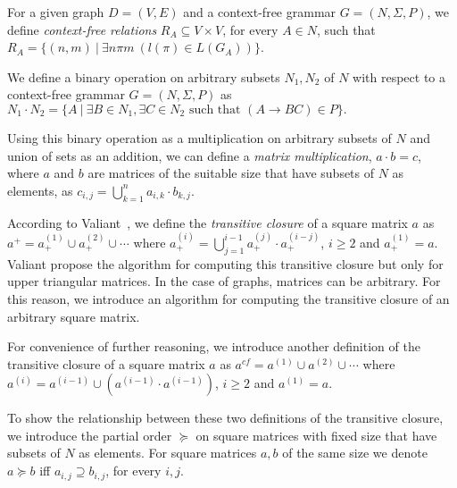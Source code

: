 For a given graph $D = (V, E)$ and a context-free grammar $G = (N, \Sigma, P)$, we define \textit{context-free relations} $R_A \subseteq V \times V$, for every $A \in N$, such that $R_A = \{(n,m)~|~\exists n \pi m~(l(\pi) \in L(G_A))\}$.

We define a binary operation on arbitrary subsets $N_1 , N_2$ of $N$ with respect to a context-free grammar $G = (N, \Sigma, P)$ as $N_1 \cdot N_2 = \{A~|~\exists B \in N_1, \exists C \in N_2 \text{ such that }(A \rightarrow B C) \in P\}.$

Using this binary operation as a multiplication on arbitrary subsets of $N$ and union of sets as an addition, we can define a \textit{matrix multiplication}, $a \cdot b = c$, where $a$ and $b$ are matrices of the suitable size that have subsets of $N$ as elements, as $c_{i,j} = \bigcup^{n}_{k=1}{a_{i,k} \cdot b_{k,j}}$.

According to Valiant~\cite{valiant}, we define the \textit{transitive closure} of a square matrix $a$ as $a^+ = a^{(1)}_+ \cup a^{(2)}_+ \cup \cdots$ where $a^{(i)}_+ = \bigcup^{i-1}_{j=1}{a^{(j)}_+ \cdot a^{(i-j)}_+}$, $i \ge 2$ and $a^{(1)}_+ = a$. Valiant propose the algorithm for computing this transitive closure but only for upper triangular matrices. In the case of graphs, matrices can be arbitrary. For this reason, we introduce an algorithm for computing the transitive closure of an arbitrary square matrix.

For convenience of further reasoning, we introduce another definition of the transitive closure of a square matrix $a$ as $a^{cf} = a^{(1)} \cup a^{(2)} \cup \cdots$ where $a^{(i)} = a^{(i-1)} \cup (a^{(i-1)} \cdot a^{(i-1)})$, $i \ge 2$ and $a^{(1)} = a$.

To show the relationship between these two definitions of the transitive closure, we introduce the partial order $\succeq$ on square matrices with fixed size that have subsets of $N$ as elements. For square matrices $a, b$ of the same size we denote $a \succeq b$ iff $a_{i,j} \supseteq b_{i,j}$, for every $i, j$.

